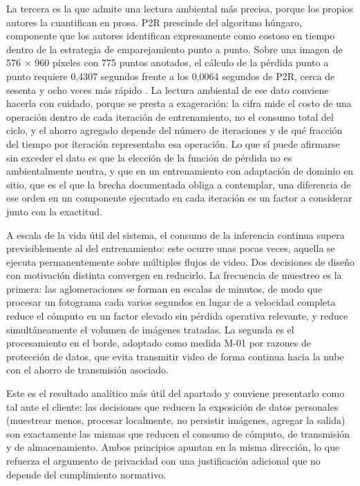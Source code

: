 La tercera es la que admite una lectura ambiental más precisa, porque
los propios autores la cuantifican en prosa. P2R prescinde del algoritmo
húngaro, componente que los autores identifican expresamente como
costoso en tiempo dentro de la estrategia de emparejamiento punto a
punto. Sobre una imagen de 576 × 960 píxeles con 775 puntos anotados, el
cálculo de la pérdida punto a punto requiere 0,4307 segundos frente a
los 0,0064 segundos de P2R, cerca de sesenta y ocho veces más rápido
\cite{Lin_2025_CVPR}. La lectura ambiental de ese dato conviene hacerla
con cuidado, porque se presta a exageración: la cifra mide el costo de
una operación dentro de cada iteración de entrenamiento, no el consumo
total del ciclo, y el ahorro agregado depende del número de iteraciones
y de qué fracción del tiempo por iteración representaba esa operación.
Lo que sí puede afirmarse sin exceder el dato es que la elección de la
función de pérdida no es ambientalmente neutra, y que en un
entrenamiento con adaptación de dominio en sitio, que es el que la
brecha documentada obliga a contemplar, una diferencia de ese orden en
un componente ejecutado en cada iteración es un factor a considerar
junto con la exactitud.

A escala de la vida útil del sistema, el consumo de la inferencia
continua supera previsiblemente al del entrenamiento: este ocurre unas
pocas veces, aquella se ejecuta permanentemente sobre múltiples flujos
de video. Dos decisiones de diseño con motivación distinta convergen en
reducirlo. La frecuencia de muestreo es la primera: las aglomeraciones
se forman en escalas de minutos, de modo que procesar un fotograma cada
varios segundos en lugar de a velocidad completa reduce el cómputo en un
factor elevado sin pérdida operativa relevante, y reduce simultáneamente
el volumen de imágenes tratadas. La segunda es el procesamiento en el
borde, adoptado como medida M-01 por razones de protección de datos, que
evita transmitir video de forma continua hacia la nube con el ahorro de
transmisión asociado.

Este es el resultado analítico más útil del apartado y conviene
presentarlo como tal ante el cliente: las decisiones que reducen la
exposición de datos personales (muestrear menos, procesar localmente, no
persistir imágenes, agregar la salida) son exactamente las mismas que
reducen el consumo de cómputo, de transmisión y de almacenamiento. Ambos
principios apuntan en la misma dirección, lo que refuerza el argumento
de privacidad con una justificación adicional que no depende del
cumplimiento normativo.

